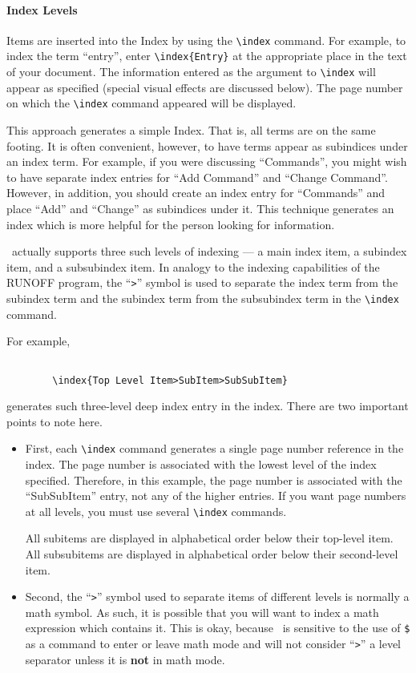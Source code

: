 \paragraph{Index Levels} 
Items are inserted into the Index by using the \verb~\index~ command.  For 
example, to index the term ``entry'', enter \verb~\index{Entry}~
at the appropriate place in the text of your document.  The information entered
as the argument to \verb~\index~ will appear as 
specified (special visual effects are discussed below).  The page number on
which the \verb~\index~ command appeared will be displayed. 

This approach generates a simple Index.  That is, all terms are on the same
footing.  It is often convenient, however, to have terms appear as subindices
under an index term.  For example, if you were discussing ``Commands'', you
might wish to have separate index entries for ``Add Command'' and ``Change
Command''.  However, in addition, you should create an index entry for 
``Commands'' and place ``Add'' and ``Change'' as subindices under it.  This 
technique generates an index which is more helpful for the person looking for
information.

\IdxTeX\ actually supports three such levels of indexing --- a main index item,
a subindex item, and a subsubindex item.  In analogy to the indexing 
capabilities of the RUNOFF program, the 
``\verb~>~'' symbol is used to separate
the index term from the subindex term and the subindex term from the subsubindex
term in the \verb~\index~ command.  

For example,
\begin{verbatim}

        \index{Top Level Item>SubItem>SubSubItem}

\end{verbatim}
generates such three-level deep
index entry in the index.  
There are two important points to note here.

\begin{itemize}
\item First, each \verb~\index~ command generates a single page number reference
in the index.  The page number is associated with the lowest level of the index
specified.  Therefore, in this example, the page number is associated with the
``SubSubItem'' entry, not any of the higher entries.  If you want page numbers
at all levels, you must use several \verb~\index~ commands.

All subitems are displayed in alphabetical order below their top-level item.
All subsubitems are displayed in alphabetical order below their second-level
item.

\item Second, the ``\verb~>~'' symbol used to separate items of different
levels is normally a math symbol.  As such, it is possible that you will want
to index a math expression which contains it.  This is okay, because \IdxTeX\
is sensitive to the use of {\tt \$} as a command to enter or leave math mode
and will not consider ``\verb~>~'' a level separator unless it is {\bf not\/}
in math mode.

\end{itemize}

